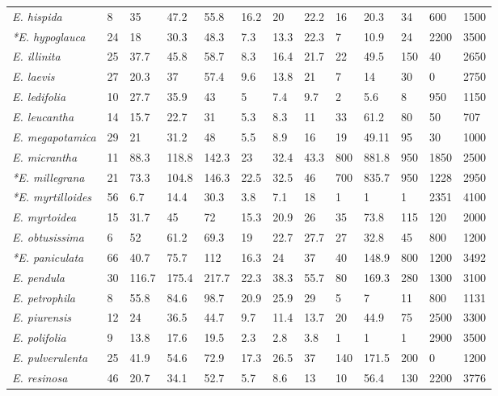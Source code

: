 \documentclass[fleqn,10pt,lineno]{wlpeerj} %
\begin{document}
\begin{table}[hbt]
\begin{center}
\begin{tabular}{lllllllllllll}
\emph{E. hispida} & 8 & 35 & 47.2 & 55.8 & 16.2 & 20 & 22.2 & 16 & 20.3 & 34 & 600 & 1500\\
\emph{*E. hypoglauca} & 24 & 18 & 30.3 & 48.3 & 7.3 & 13.3 & 22.3 & 7 & 10.9 & 24 & 2200 & 3500\\
\emph{E. illinita} & 25 & 37.7 & 45.8 & 58.7 & 8.3 & 16.4 & 21.7 & 22 & 49.5 & 150 & 40 & 2650\\
\emph{E. laevis} & 27 & 20.3 & 37 & 57.4 & 9.6 & 13.8 & 21 & 7 & 14 & 30 & 0 & 2750\\
\emph{E. ledifolia} & 10 & 27.7 & 35.9 & 43 & 5 & 7.4 & 9.7 & 2 & 5.6 & 8 & 950 & 1150\\
\emph{E. leucantha} & 14 & 15.7 & 22.7 & 31 & 5.3 & 8.3 & 11 & 33 & 61.2 & 80 & 50 & 707\\
\emph{E. megapotamica} & 29 & 21 & 31.2 & 48 & 5.5 & 8.9 & 16 & 19 & 49.11 & 95 & 30 & 1000\\
\emph{E. micrantha} & 11 & 88.3 & 118.8 & 142.3 & 23 & 32.4 & 43.3 & 800 & 881.8 & 950 & 1850 & 2500\\
\emph{*E. millegrana} & 21 & 73.3 & 104.8 & 146.3 & 22.5 & 32.5 & 46 & 700 & 835.7 & 950 & 1228 & 2950\\
\emph{*E. myrtilloides} & 56 & 6.7 & 14.4 & 30.3 & 3.8 & 7.1 & 18 & 1 & 1 & 1 & 2351 & 4100\\
\emph{E. myrtoidea} & 15 & 31.7 & 45 & 72 & 15.3 & 20.9 & 26 & 35 & 73.8 & 115 & 120 & 2000\\
\emph{E. obtusissima} & 6 & 52 & 61.2 & 69.3 & 19 & 22.7 & 27.7 & 27 & 32.8 & 45 & 800 & 1200\\
\emph{*E. paniculata} & 66 & 40.7 & 75.7 & 112 & 16.3 & 24 & 37 & 40 & 148.9 & 800 & 1200 & 3492\\
\emph{E. pendula} & 30 & 116.7 & 175.4 & 217.7 & 22.3 & 38.3 & 55.7 & 80 & 169.3 & 280 & 1300 & 3100\\
\emph{E. petrophila} & 8 & 55.8 & 84.6 & 98.7 & 20.9 & 25.9 & 29 & 5 & 7 & 11 & 800 & 1131\\
\emph{E. piurensis} & 12 & 24 & 36.5 & 44.7 & 9.7 & 11.4 & 13.7 & 20 & 44.9 & 75 & 2500 & 3300\\
\emph{E. polifolia} & 9 & 13.8 & 17.6 & 19.5 & 2.3 & 2.8 & 3.8 & 1 & 1 & 1 & 2900 & 3500\\
\emph{E. pulverulenta} & 25 & 41.9 & 54.6 & 72.9 & 17.3 & 26.5 & 37 & 140 & 171.5 & 200 & 0 & 1200\\
\emph{E. resinosa} & 46 & 20.7 & 34.1 & 52.7 & 5.7 & 8.6 & 13 & 10 & 56.4 & 130 & 2200 & 3776\\

\end{tabular}
\end{center}
\end{table}
\end{document}
